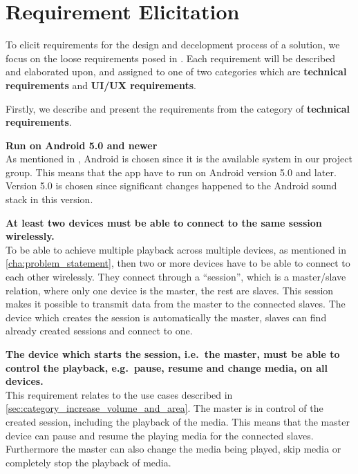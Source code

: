 \chapter{Requirement Elicitation}\label{cha:requirement_elicitation}
To elicit requirements for the design and decelopment process of a solution, we focus on the loose requirements posed in .
Each requirement will be described and elaborated upon, and assigned to one of two categories which are \textbf{technical requirements} and \textbf{UI/UX requirements}.

Firstly, we describe and present the requirements from the category of \textbf{technical requirements}.

\begin{eletterate}
    \item \textbf{Run on Android 5.0 and newer} \hfill\\
        As mentioned in , Android is chosen since it is the available system in our project group.
        This means that the app have to run on Android version 5.0 and later.
        Version 5.0 is chosen since significant changes happened to the Android sound stack in this version\cite{android_5_sound_stack}.

    \item \textbf{At least two devices must be able to connect to the same session wirelessly.} \hfill\\
        To be able to achieve multiple playback across multiple devices, as mentioned in \cref{cha:problem_statement},
        then two or more devices have to be able to connect to each other wirelessly.
        They connect through a ``session'', which is a master/slave relation, where only one device is the master, the rest are slaves.
        This session makes it possible to transmit data from the master to the connected slaves.
        The device which creates the session is automatically the master, slaves can find already created sessions and connect to one.

    \item \textbf{The device which starts the session, i.e.~the master, must be able to control the playback, e.g.~pause, resume and change media, on all devices.} \hfill\\
        This requirement relates to the use cases described in \cref{sec:category_increase_volume_and_area}.
        The master is in control of the created session, including the playback of the media.
        This means that the master device can pause and resume the playing media for the connected slaves.
        Furthermore the master can also change the media being played, skip media or completely stop the playback of media.


\end{eletterate}
